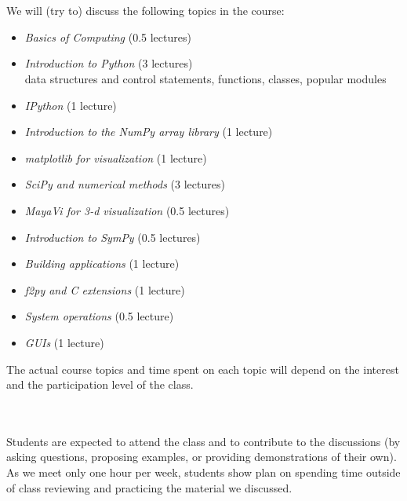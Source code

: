 \documentclass[11pt]{article}
\newenvironment{squishlist}
  {\begin{itemize}
    \addtolength{\itemsep}{-0.33\baselineskip}
   }
  { \end{itemize} }
\begin{document}
\ \\
 \\
We will (try to) discuss the following topics in the course:
\begin{squishlist}
\item {\em Basics of Computing} (0.5 lectures) 

\item {\em Introduction to Python} (3 lectures) \\
     data structures and control statements, functions, classes, popular modules

\item {\em IPython} (1 lecture)

\item {\em Introduction to the NumPy array library} (1 lecture)

\item {\em matplotlib for visualization} (1 lecture)

\item {\em SciPy and numerical methods} (3 lectures)

\item {\em MayaVi for 3-d visualization} (0.5 lectures)

\item {\em Introduction to SymPy} (0.5 lectures)

\item {\em Building applications} (1 lecture)

\item {\em f2py and C extensions} (1 lecture)

\item {\em System operations} (0.5 lecture)

\item {\em GUIs} (1 lecture)

\end{squishlist}

\noindent The actual course topics and time spent on each topic will depend on the
interest and the participation level of the class.

\ \\
 \\
Students are expected to attend the class and to contribute
to the discussions (by asking questions, proposing examples, or
providing demonstrations of their own).  As we meet only one hour per
week, students show plan on spending time outside of class reviewing
and practicing the material we discussed. 
\end{document}

